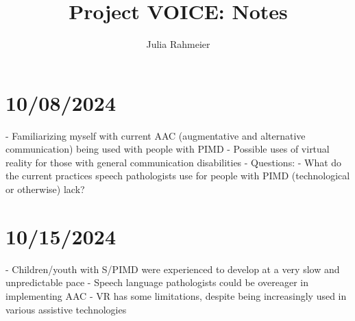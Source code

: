 \documentclass{article}
\author{Julia Rahmeier}
\title{Project VOICE: Notes}
\begin{document}
	
	\maketitle
	
	\section{10/08/2024}
	- Familiarizing myself with current AAC (augmentative and alternative communication) being used with people with PIMD
    - Possible uses of virtual reality for those with general communication disabilities
    - Questions: 
        - What do the current practices speech pathologists use for people with PIMD (technological or otherwise) lack?

	
	\section{10/15/2024}
	- Children/youth with S/PIMD were experienced to develop at a very slow and unpredictable pace
	- Speech language pathologists could be overeager in implementing AAC
	- VR has some limitations, despite being increasingly used in various assistive technologies

	
	
\end{document}
